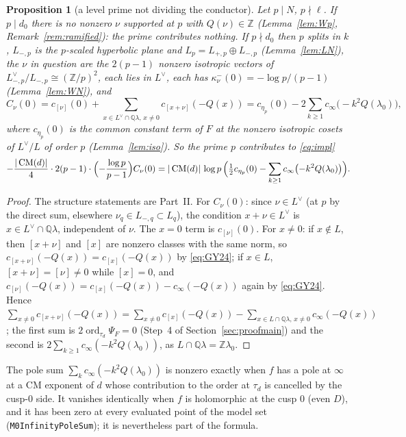 \documentclass[11pt,reqno]{amsart}
\theoremstyle{plain}
\newtheorem{proposition}[theorem]{Proposition}
\theoremstyle{definition}
\DeclareMathOperator{\ord}{ord}
\DeclareMathOperator{\CM}{CM}
\newcommand{\Q}{\mathbb{Q}}
\newcommand{\Z}{\mathbb{Z}}
\newcommand{\Ldual}{L^{\vee}}
\begin{document}
\begin{proposition}[a level prime not dividing the conductor]\label{prop:levelprime}
Let $p\mid N$, $p\nmid\ell$. If $p\mid d_0$ there is no nonzero $\nu$ supported at $p$ with
$Q(\nu)\in\Z$ (Lemma~\ref{lem:Wp}, Remark~\ref{rem:ramified}): the prime contributes nothing. If
$p\nmid d_0$ then $p$ splits in $k$, $L_{-,p}$ is the $p$-scaled hyperbolic plane and
$L_p=L_{+,p}\oplus L_{-,p}$ (Lemma~\ref{lem:LN}), the $\nu$ in question are the $2(p-1)$ nonzero
isotropic vectors of $L_{-,p}^\vee/L_{-,p}\cong(\Z/p)^2$, each lies in $\Ldual$, each has
$\kappa^-_\nu(0)=-\log p/(p-1)$ (Lemma~\ref{lem:WN}), and
\[
  C_\nu(0)=c_{[\nu]}(0)+\sum_{x\in\Ldual\cap\Q\lambda,\,x\ne0}c_{[x+\nu]}(-Q(x))
         =c_{\eta_p}(0)-2\sum_{k\ge1}c_\infty\bigl(-k^2Q(\lambda_0)\bigr),
\]
where $c_{\eta_p}(0)$ is the common constant term of $F$ at the nonzero isotropic cosets of
$\Ldual/L$ of order $p$ (Lemma~\ref{lem:iso}). So the prime $p$ contributes to \eqref{eq:impl}
\[
  -\frac{|\CM(d)|}{4}\cdot2(p-1)\cdot\Bigl(-\frac{\log p}{p-1}\Bigr)C_\nu(0)
  =|\CM(d)|\,\log p\,\Bigl(\tfrac12c_{\eta_p}(0)-\sum_{k\ge1}c_\infty\bigl(-k^2Q(\lambda_0)\bigr)\Bigr).
\]
\end{proposition}
\begin{proof}
The structure statements are Part~II. For $C_\nu(0)$: since $\nu\in\Ldual$ (at $p$ by the direct
sum, elsewhere $\nu_q\in L_{-,q}\subset L_q$), the condition $x+\nu\in\Ldual$ is $x\in\Ldual\cap
\Q\lambda$, independent of $\nu$. The $x=0$ term is $c_{[\nu]}(0)$. For $x\neq0$: if $x\notin L$,
then $[x+\nu]$ and $[x]$ are nonzero classes with the same norm, so $c_{[x+\nu]}(-Q(x))=
c_{[x]}(-Q(x))$ by \eqref{eq:GY24}; if $x\in L$, $[x+\nu]=[\nu]\ne0$ while $[x]=0$, and
$c_{[\nu]}(-Q(x))=c_{[x]}(-Q(x))-c_\infty(-Q(x))$ again by \eqref{eq:GY24}. Hence
$\sum_{x\ne0}c_{[x+\nu]}(-Q(x))=\sum_{x\neq0}c_{[x]}(-Q(x))-\sum_{x\in L\cap\Q\lambda,\,x\ne0}
c_\infty(-Q(x))$; the first sum is $2\ord_{\tau_d}\Psi_F=0$ (Step~4 of Section~\ref{sec:proofmain})
and the second is $2\sum_{k\ge1}c_\infty(-k^2Q(\lambda_0))$, as $L\cap\Q\lambda=\Z\lambda_0$.
\end{proof}

The pole sum $\sum_kc_\infty(-k^2Q(\lambda_0))$ is nonzero exactly when $f$ has a pole at $\infty$
at a CM exponent of $d$ whose contribution to the order at $\tau_d$ is cancelled by the cusp-$0$
side. It vanishes identically when $f$ is holomorphic at the cusp $0$ (even $D$), and it has been
zero at every evaluated point of the model set (\texttt{M0InfinityPoleSum}); it is nevertheless
part of the formula.
\end{document}
